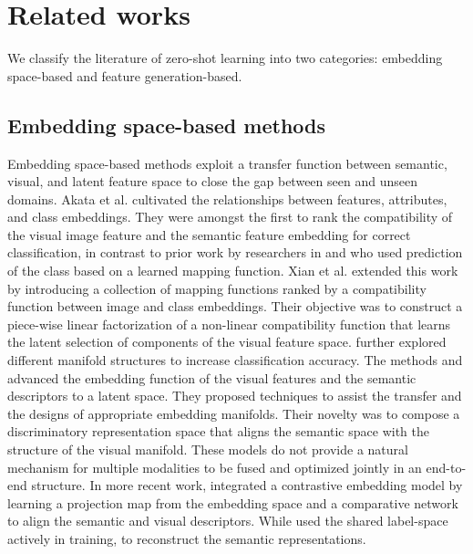 \documentclass{article}
\begin{document}
\section{Related works}
We classify the literature of zero-shot learning into two categories: embedding space-based  and feature generation-based.

\subsection{Embedding space-based methods}
Embedding space-based methods exploit a transfer function between semantic, visual, and latent feature space to close the gap between seen and unseen domains. Akata et al. \cite{b1} cultivated the relationships between features, attributes, and class embeddings. They were amongst the first to rank the compatibility of the visual image feature and the semantic feature embedding for correct classification, in contrast to prior work by researchers in \cite{b68} and \cite{b23} who used prediction of the class based on a learned mapping function.  Xian et al. \cite{b26} extended this work by introducing a collection of mapping functions ranked by a compatibility function between image and class embeddings. Their objective was to construct a piece-wise linear factorization of a non-linear compatibility function that learns the latent selection of components of the visual feature space.  \cite{b25, b27, b30} further explored different manifold structures to increase classification accuracy. The methods \cite{b14, b15, b16, b17} and \cite{b19} advanced the embedding function of the visual features and the semantic descriptors to a latent space. They proposed techniques to assist the transfer and the designs of appropriate embedding manifolds. Their novelty was to compose a discriminatory representation space that aligns the semantic space with the structure of the visual manifold. These models do not provide a natural mechanism for multiple modalities to be fused and optimized jointly in an end-to-end structure. In more recent work, \cite{b18} integrated a contrastive embedding model by learning a projection map from the embedding space and a comparative network to align the semantic and visual descriptors. While \cite{b70} used the shared label-space actively in training, to reconstruct the semantic representations. 
\end{document}
